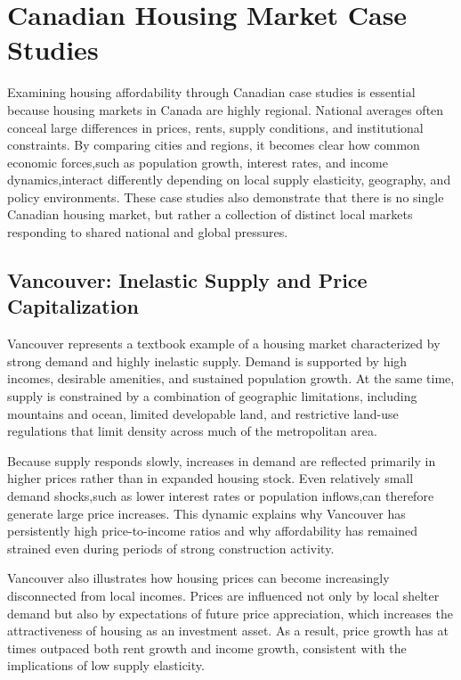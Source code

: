 \documentclass[11pt]{article}
\begin{document}
\section{Canadian Housing Market Case Studies}

Examining housing affordability through Canadian case studies is essential because housing markets in Canada are highly regional. National averages often conceal large differences in prices, rents, supply conditions, and institutional constraints. By comparing cities and regions, it becomes clear how common economic forces,such as population growth, interest rates, and income dynamics,interact differently depending on local supply elasticity, geography, and policy environments. These case studies also demonstrate that there is no single Canadian housing market, but rather a collection of distinct local markets responding to shared national and global pressures.

\subsection*{Vancouver: Inelastic Supply and Price Capitalization}

Vancouver represents a textbook example of a housing market characterized by strong demand and highly inelastic supply. Demand is supported by high incomes, desirable amenities, and sustained population growth. At the same time, supply is constrained by a combination of geographic limitations, including mountains and ocean, limited developable land, and restrictive land-use regulations that limit density across much of the metropolitan area.

Because supply responds slowly, increases in demand are reflected primarily in higher prices rather than in expanded housing stock. Even relatively small demand shocks,such as lower interest rates or population inflows,can therefore generate large price increases. This dynamic explains why Vancouver has persistently high price-to-income ratios and why affordability has remained strained even during periods of strong construction activity.

Vancouver also illustrates how housing prices can become increasingly disconnected from local incomes. Prices are influenced not only by local shelter demand but also by expectations of future price appreciation, which increases the attractiveness of housing as an investment asset. As a result, price growth has at times outpaced both rent growth and income growth, consistent with the implications of low supply elasticity.
\end{document}
